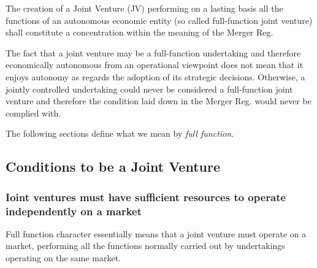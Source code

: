 
    The creation of a Joint Venture (JV) performing on a lasting basis all the functions of an autonomous economic entity (so called full-function joint venture) shall constitute a concentration within the meaning of the Merger Reg.

    The fact that a joint venture may be a full-function undertaking and therefore economically autonomous from an operational viewpoint does not mean that it enjoys autonomy as regards the adoption of its strategic decisions. Otherwise, a jointly controlled undertaking could never be considered a full-function joint venture and therefore the condition laid down in the Merger Reg. would never be complied with.


    The following sections define what we mean by \textit{full function}.

\newpage
    \subsection{Conditions to be a Joint Venture}

        \subsubsection{Ioint ventures must have sufficient resources to operate independently on a market}

            Full function character essentially means that a joint venture must operate on a market, performing all the functions normally carried out by undertakings operating on the same market. 
            
